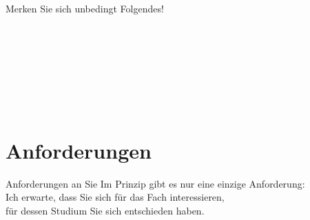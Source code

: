 \begin{frame}
  {Merken Sie sich unbedingt Folgendes!}
  \onslide<+->
  \onslide<+->
  \centering 
  \\\Halbzeile\onslide<+->
  \\\Halbzeile\onslide<+->
  \\\Halbzeile\onslide<+->
  \\\Halbzeile\onslide<+->
  \\\Halbzeile\onslide<+->
  \\\Halbzeile\onslide<+->
  \\\Halbzeile\onslide<+->
  \\\Halbzeile\onslide<+->
  \onslide<+->%
  \rot{\Huge !}\onslide<+->%
  \rot{\Huge !}\onslide<+->%
  \rot{\Huge !}\onslide<+->%
\end{frame}


\section{Anforderungen}

\begin{frame}
  {Anforderungen an Sie}
  \onslide<+->
  \onslide<+->
  \centering 
  Im Prinzip gibt es nur eine einzige Anforderung:\\
  \onslide<+->
  \Doppelzeile
  \alert{\Large Ich erwarte, dass Sie sich für das Fach interessieren,\\
    \Viertelzeile
  für dessen Studium Sie sich entschieden haben.}
\end{frame}


